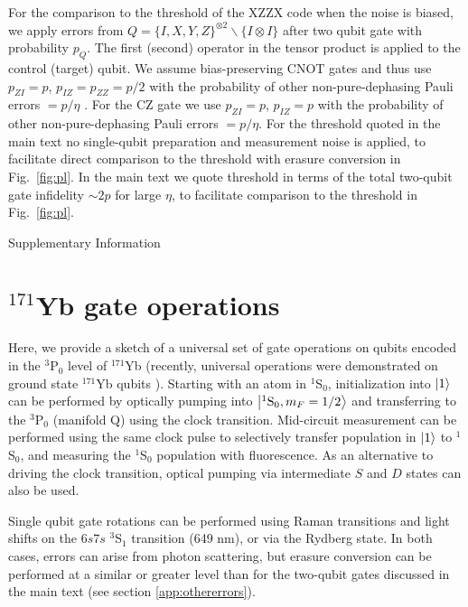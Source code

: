 \documentclass[%
reprint,
superscriptaddress,
 amsmath,amssymb,
 aps,
 prx,
floatfix,
]{revtex4-1}
\begin{document}
For the comparison to the threshold of the XZZX code when the noise is biased, we apply errors from $Q= \{I,X,Y,Z\}^{\otimes 2}\backslash \{I\otimes I\}$ after two qubit gate with probability $p_Q$. The first (second) operator in the tensor product is applied to the control (target) qubit. We assume bias-preserving CNOT gates and thus use $p_{ZI}=p$, $p_{IZ}=p_{ZZ}=p/2$ with the probability of other non-pure-dephasing Pauli errors $=p/\eta$ \cite{darmawan2021}. For the CZ gate we use $p_{ZI}=p$, $p_{IZ}=p$ with the probability of other non-pure-dephasing Pauli errors $=p/\eta$. For the threshold quoted in the main text no single-qubit preparation and measurement noise is applied, to facilitate direct comparison to the threshold with erasure conversion in Fig.~\ref{fig:pl}. In the main text we quote threshold in terms of the total two-qubit gate infidelity $\sim 2p$ for large $\eta$, to facilitate comparison to the threshold in Fig.~\ref{fig:pl}.



\clearpage

\setcounter{section}{0}
\renewcommand{\thesection}{S\arabic{section}}
\renewcommand\theequation{S\arabic{equation}}
\renewcommand\thefigure{S\arabic{figure}}
\renewcommand\thetable{S\arabic{table}}

\begin{center}
    {\LARGE Supplementary Information}
\end{center}

\section{$^{171}$Yb gate operations}
\label{app:protocols}
Here, we provide a sketch of a universal set of gate operations on qubits encoded in the ${}^3$P${}_0$ level of $^{171}$Yb (recently, universal operations were demonstrated on ground state $^{171}$Yb qubits \cite{ma2021}). Starting with an atom in $^1$S$_0$, initialization into $\ket{1}$ can be performed by optically pumping into $\ket{^1\text{S}_0, m_F=1/2}$ and transferring to the $^3$P$_0$ (manifold Q) using the clock transition. Mid-circuit measurement can be performed using the same clock pulse to selectively transfer population in $\ket{1}$ to $^1$S$_0$, and measuring the ${}^1$S${}_0$ population with fluorescence. As an alternative to driving the clock transition, optical pumping via intermediate $S$ and $D$ states can also be used.

Single qubit gate rotations can be performed using Raman transitions and light shifts on the $6s7s$ $^3$S$_1$ transition (649 nm), or via the Rydberg state. In both cases, errors can arise from photon scattering, but erasure conversion can be performed at a similar or greater level than for the two-qubit gates discussed in the main text (see section \ref{app:othererrors}).
\end{document}
